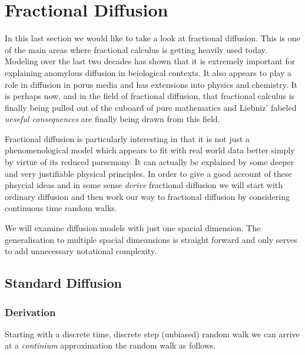 \section{Fractional Diffusion}
In this last section we would like to take a look at fractional diffusion. This is one of the main areas where fractional calculus is getting heavily used today. Modeling over the last two decades has shown that it is extremely important for explaining anomylous diffusion in beiological contexts. It also appears to play a role in diffusion in porus media and has extensions into physics and chemistry. It is perhaps now, and in the field of fractional diffusion, that fractional calculus is finally being pulled out of the cuboard of pure mathematics and Liebniz' fabeled \emph{ueseful consequences} are finally being drawn from this field.

Fractional diffusion is particularly interesting in that it is not just a phenomenological model which appears to fit with real world data better simply by virtue of its reduced parsemony. It can actually be explained by some deeper and very justifiable physical principles. In order to give a good account of these phsycial ideas and in some sense \emph{derive} fractional diffusion we will start with ordinary diffusion and then work our way to fractional diffusion by considering continuous time random walks.

We will examine diffusion models with just one spacial dimension. The generalisation to multiple spacial dimeansions is straight forward and only serves to add unnecessary notational complexity.

\subsection{Standard Diffusion}
\label{sec:std_diff_derivation}
\subsubsection{Derivation}
Starting with a discrete time, discrete step (unbiased) random walk we can arrive at a \emph{continium} approximation the random walk as follows. 

